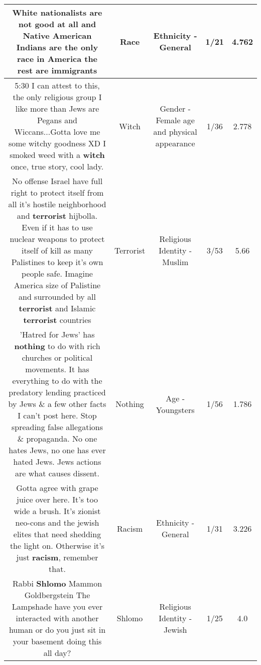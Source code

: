 \documentclass[11pt]{article}
\newlength\mylength
\begin{document}
\begin{center}
\begin{longtable}{|C{.65\mylength}|C{.30\mylength}|C{.12\mylength}|C{.12\mylength}|C{.12\mylength}|}
  \small White nationalists are not good at all and Native American Indians are the only \textbf{race} in America the rest are immigrants\normalsize   & Race & Ethnicity - General & 1/21 & 4.762 \\  \hline
  \small 5:30 I can attest to this, the only religious group I like more than Jews are Pegans and Wiccans...Gotta love me some witchy goodness XD I smoked weed with a \textbf{witch} once, true story, cool lady.\normalsize   & Witch & Gender - Female age and physical appearance & 1/36 & 2.778 \\  \hline
  \small No offense Israel have full right to protect itself from all it's hostile neighborhood and \textbf{terrorist} hijbolla. Even if it has to use nuclear weapons to protect itself of kill as many Palistines to keep it's own people safe. Imagine America size of Palistine and surrounded by all \textbf{terrorist} and Islamic \textbf{terrorist} countries\normalsize   & Terrorist & Religious Identity - Muslim & 3/53 & 5.66 \\  \hline
  \small 'Hatred for Jews' has \textbf{nothing} to do with rich churches or political movements. It has everything to do with the predatory lending practiced by Jews \& a few other facts I can't post here. Stop spreading false allegations \& propaganda. No one hates Jews, no one has ever hated Jews. Jews actions are what causes dissent.\normalsize   & Nothing & Age - Youngsters & 1/56 & 1.786 \\  \hline
  \small Gotta agree with grape juice over here. It's too wide a brush. It's zionist neo-cons and the jewish elites that need shedding the light on. Otherwise it's just \textbf{racism}, remember that.\normalsize   & Racism & Ethnicity - General & 1/31 & 3.226 \\  \hline
  \small Rabbi \textbf{Shlomo} Mammon Goldbergstein The Lampshade have you ever interacted with another human or do you just sit in your basement doing this all day?\normalsize   & Shlomo & Religious Identity - Jewish & 1/25 & 4.0 \\  \hline

\end{longtable}
\end{center}
\end{document}
